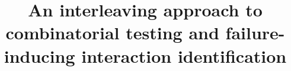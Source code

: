 \documentclass[journal,12pt,onecolumn,draftclsnofoot,]{IEEEtran}
\begin{document}
%
\title{An interleaving approach to combinatorial testing and failure-inducing interaction identification}
%
%
%
%
\end{document}
